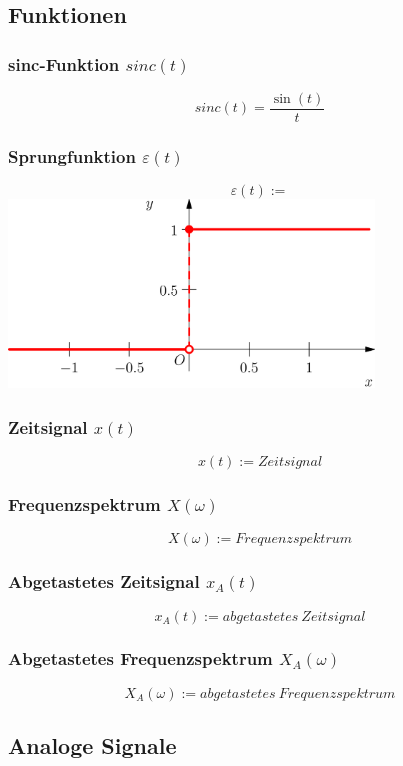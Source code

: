 \documentclass[12pt,a4paper]{scrartcl}
\begin{document}
\subsection{Funktionen}
\label{sec:sub:funktionen}
\subsubsection{sinc-Funktion $sinc(t)$}
\label{sec:sub:sub:sinc-funktion}
$$sinc(t) = \frac{\sin(t)}{t}$$
\subsubsection{Sprungfunktion $\varepsilon(t)$}
\label{sec:sub:sub:sprungfunktion}
$$\varepsilon(t) := $$ \includegraphics[height=5cm]{Pictures/Heaviside.svg.png}
\subsubsection{Zeitsignal $x(t)$}
\label{sec:sub:sub:zeitsignal}
$$x(t) := Zeitsignal$$
\subsubsection{Frequenzspektrum $X(\omega)$}
\label{sec:sub:sub:frequenzspektrum}
$$X(\omega) := Frequenzspektrum $$
\subsubsection{Abgetastetes Zeitsignal $x_A(t)$}
\label{sec:sub:sub:abgetastetes-zeitsignal}
$$x_A(t) := abgetastetes\ Zeitsignal$$
\subsubsection{Abgetastetes Frequenzspektrum $X_A(\omega)$}
\label{sec:sub:sub:abgetastetes-frequenzspektrum}
$$X_A(\omega) := abgetastetes\ Frequenzspektrum $$

\subsection{Analoge Signale}
\label{sec:sub:const-def-analoge-signale}
\end{document}
